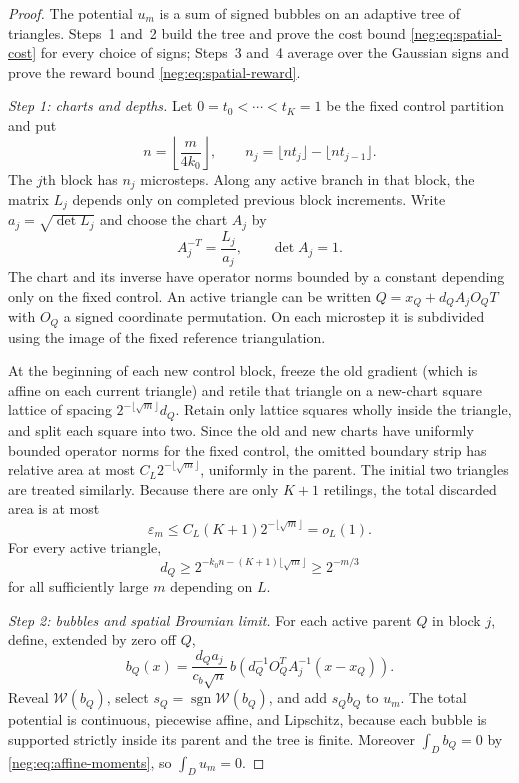 \documentclass[11pt]{article}
\theoremstyle{definition}
\theoremstyle{remark}
\numberwithin{equation}{section}
\begin{document}
\begin{proof}
The potential $u_m$ is a sum of signed bubbles on an adaptive tree of
triangles. Steps~1 and~2 build the tree and prove the cost bound
\eqref{neg:eq:spatial-cost} for every choice of signs; Steps~3 and~4
average over the Gaussian signs and prove the reward bound
\eqref{neg:eq:spatial-reward}.

\emph{Step 1: charts and depths.}
Let $0=t_0<\cdots<t_K=1$ be the fixed control partition and put
\[
 n=\left\lfloor\frac{m}{4k_0}\right\rfloor,
 \qquad n_j=\lfloor nt_j\rfloor-\lfloor nt_{j-1}\rfloor.
\]
The $j$th block has $n_j$ microsteps. Along any active branch in that
block, the matrix $L_j$ depends only on completed previous block
increments. Write $a_j=\sqrt{\det L_j}$ and choose the chart $A_j$
by
\begin{equation}\label{neg:eq:chart}
 A_j^{-T}=\frac{L_j}{a_j},\qquad \det A_j=1.
\end{equation}
The chart and its inverse have operator norms bounded by a
constant depending only on the fixed control. An active
triangle can be written
$Q=x_Q+d_QA_jO_QT$ with $O_Q$ a signed coordinate permutation.
On each microstep it is subdivided using the image of the fixed
reference triangulation.

At the beginning of each new control block, freeze the old
gradient (which is affine on each current triangle) and retile that
triangle on a new-chart square lattice of spacing
$2^{-\lfloor\sqrt m\rfloor}d_Q$. Retain only lattice squares wholly
inside the triangle, and split each square into two. Since the old and
new charts have uniformly bounded operator norms for the fixed control,
the omitted boundary strip has relative area at most
$C_L2^{-\lfloor\sqrt m\rfloor}$, uniformly in the parent.
The initial two triangles are treated similarly. Because there are
only $K+1$ retilings, the total discarded area is at most
\begin{equation}\label{neg:eq:area-loss}
 \varepsilon_m\le C_L(K+1)2^{-\lfloor\sqrt m\rfloor}=o_L(1).
\end{equation}
For every active triangle,
\begin{equation}\label{neg:eq:leg-lower}
 d_Q\ge2^{-k_0n-(K+1)\lfloor\sqrt m\rfloor}
       \ge2^{-m/3}
\end{equation}
for all sufficiently large $m$ depending on $L$.

\emph{Step 2: bubbles and spatial Brownian limit.}
For each active parent $Q$ in block $j$, define, extended by zero
off $Q$,
\begin{equation}\label{neg:eq:bubble}
 b_Q(x)=\frac{d_Qa_j}{c_b\sqrt n}\,
 b\!\left(d_Q^{-1}O_Q^TA_j^{-1}(x-x_Q)\right).
\end{equation}
Reveal $\mathcal W(b_Q)$, select
$s_Q=\operatorname{sgn}\mathcal W(b_Q)$, and add $s_Qb_Q$ to $u_m$.
The total potential is continuous, piecewise affine, and Lipschitz,
because each bubble is supported strictly inside its parent and the
tree is finite. Moreover $\int_Db_Q=0$ by \eqref{neg:eq:affine-moments},
so $\int_Du_m=0$.


\end{proof}
\end{document}

